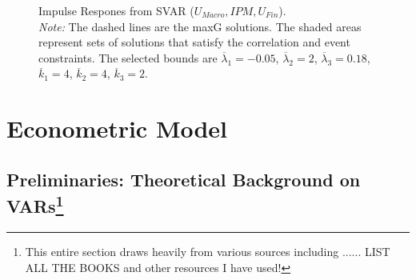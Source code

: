 \documentclass[a4paper,11pt,listof=nochaptergap,oneside,pointednumbers,bibtotoc,bigheadings,liststotoc]{scrbook}
\theoremstyle{mysatz}
\theoremstyle{mydefinition}
\theoremstyle{mybemerkung}
\begin{document}
\begin{figure}[!h]
   \centering
   \setlength\fboxsep{0pt}
   \setlength\fboxrule{0pt}
      \caption[Impulse Respones from SVAR ($U_{Macro}, IPM, U_{Fin}$).]{Impulse Respones from SVAR ($U_{Macro}, IPM, U_{Fin}$).\\
      \textit{Note:}  The dashed lines are the maxG solutions. The shaded areas represent sets of solutions that satisfy the correlation and event constraints. The selected bounds are $\overline{\lambda}_1 = -0.05$, $\overline{\lambda}_2 = 2$, $\overline{\lambda}_3 = 0.18$, $\overline{k}_1 = 4$, $\overline{k}_2 = 4$, $\overline{k}_3 = 2$.}   \label{fig:impulse.responses_all.SVAR}
\end{figure}


\chapter{Econometric Model}
\label{sec:EconometricModel}

\section[Preliminaries: Theoretical Background on (S)VARs]{Preliminaries: Theoretical Background on VARs\footnote{This entire section draws heavily from various sources including ...... LIST ALL THE BOOKS and other resources I have used!}}
\label{sec:TheoreticalBackgroundSVARs}
\end{document}
